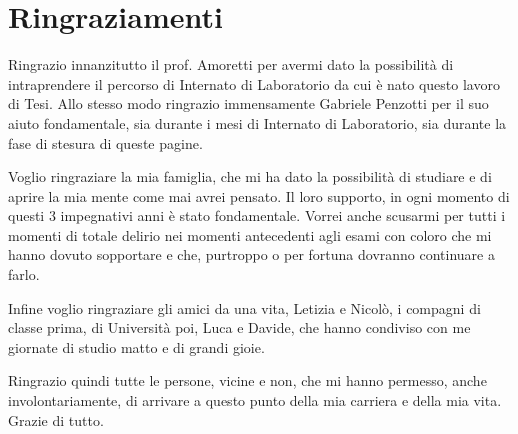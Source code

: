 \chapter*{Ringraziamenti}

Ringrazio innanzitutto il prof. Amoretti per avermi dato la possibilità di intraprendere il percorso di Internato di Laboratorio da cui è nato questo lavoro di Tesi. Allo stesso modo ringrazio immensamente Gabriele Penzotti per il suo aiuto fondamentale, sia durante i mesi di Internato di Laboratorio, sia durante la fase di stesura di queste pagine.

Voglio ringraziare la mia famiglia, che mi ha dato la possibilità di studiare e di aprire la mia mente come mai avrei pensato. Il loro supporto, in ogni momento di questi 3 impegnativi anni è stato fondamentale. Vorrei anche scusarmi per tutti i momenti di totale delirio nei momenti antecedenti agli esami con coloro che mi hanno dovuto sopportare e che, purtroppo o per fortuna dovranno continuare a farlo.

Infine voglio ringraziare gli amici da una vita, Letizia e Nicolò, i compagni di classe prima, di Università poi, Luca e Davide, che hanno condiviso con me giornate di studio matto e di grandi gioie. 

Ringrazio quindi tutte le persone, vicine e non, che mi hanno permesso, anche involontariamente, di arrivare a questo punto della mia carriera e della mia vita. Grazie di tutto.